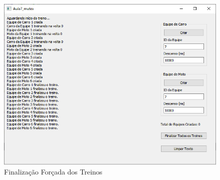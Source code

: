 \documentclass[12pt,a4paper]{article}
\begin{document}
\begin{figure}[H]
\centering
\includegraphics[width=\textwidth]{qt_finish}
\caption{Finalização Forçada dos Treinos}
\label{qt_finish}
\end{figure}

\medskip

\printbibliography
\end{document}
